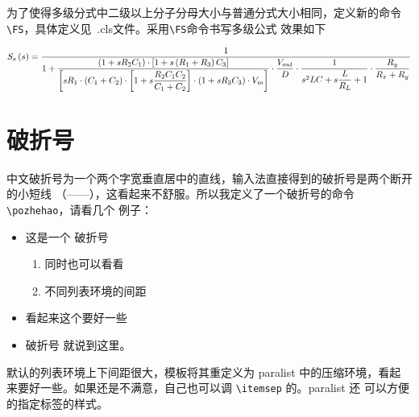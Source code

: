 为了使得多级分式中二级以上分子分母大小与普通分式大小相同，定义新的命令\verb|\FS|，具体定义见~.cls文件。采用\verb|\FS|命令书写多级公式
效果如下

\begin{small}
\begin{equation}
\label{equ6}
  S_s\left(s\right) =\displaystyle\frac{1}{1+\displaystyle\frac{\left(1+sR_2C_1\right)\cdot\left[1+s\left(R_1+R_3\right)C_3\right]}{\left[{sR_1}\cdot\left(C_1+C_2\right)\cdot\left[1+s\displaystyle\frac{R_2C_1C_2}{C_1+C_2}\right]\cdot\left(1+sR_3C_3\right)\cdot{V_m}\right]}\cdot\displaystyle\frac{V_{out}}{D}\cdot\displaystyle\frac{1}{s^2LC+{s}\displaystyle\frac{L}{R_L}+1}\cdot\displaystyle\frac{R_y}{R_x+R_y}}
\end{equation}
\end{small}
\section{破折号}
\label{sec:pozhehao}

中文破折号为一个两个字宽垂直居中的直线，输入法直接得到的破折号是两个断开的小短线
（——），这看起来不舒服。所以我定义了一个破折号的命令 \verb|\pozhehao|，请看几个
例子：
\begin{itemize}
\item 这是一个 \pozhehao 破折号
  \begin{enumerate}[(1)]
  \item 同时也可以看看
  \item 不同列表环境的间距
  \end{enumerate}
\item 看起来这个要好一些
\item 破折号 \pozhehao 就说到这里。
\end{itemize}

默认的列表环境上下间距很大，模板将其重定义为 \textsf{paralist} 中的压缩环境，看起
来要好一些。如果还是不满意，自己也可以调 \verb|\itemsep| 的。\textsf{paralist} 还
可以方便的指定标签的样式。


